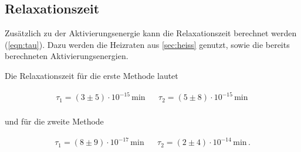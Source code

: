 \subsection{Relaxationszeit}
Zusätzlich zu der Aktivierungsenergie kann die Relaxationszeit berechnet werden (\ref{eqn:tau}). Dazu werden die Heizraten aus \autoref{sec:heiss} genutzt, sowie die 
bereits berechneten Aktivierungsenergien.

\noindent
Die Relaxationszeit für die erste Methode lautet 

\begin{align*}
  \tau_{1} =  (3 \pm 5)\cdot 10^{-15}\,\si{\minute} &&  \tau_{2} = (5 \pm 8)\cdot 10^{-15}\,\si{\minute}\,  \\ 
\end{align*}

und für die zweite Methode

\begin{align*}
  \tau_{1} =  ( 8\pm 9)\cdot 10^{-17}\,\si{\minute} &&  \tau_{2} = (2\pm 4)\cdot 10^{-14}\,\si{\minute}\, . \\ 
\end{align*}


